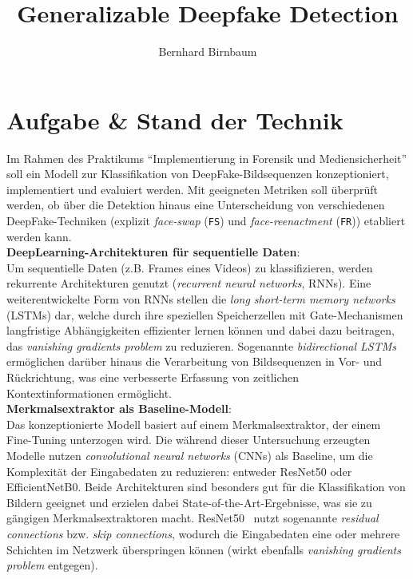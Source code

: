 \documentclass{article}
\title{Generalizable Deepfake Detection}
\author{Bernhard Birnbaum}
\newcommand{\resnet}{ResNet50\xspace}
\newcommand{\effnet}{EfficientNetB0\xspace}
\begin{document}
\maketitle

\section{Aufgabe \& Stand der Technik}\label{sec:introduction}
Im Rahmen des Praktikums \enquote{Implementierung in Forensik und Mediensicherheit} soll ein Modell zur Klassifikation von DeepFake-Bildsequenzen konzeptioniert, implementiert und evaluiert werden.
Mit geeigneten Metriken soll überprüft werden, ob über die Detektion hinaus eine Unterscheidung von verschiedenen DeepFake-Techniken (explizit \textit{face-swap} (\texttt{FS}) und \textit{face-reenactment} (\texttt{FR})) etabliert werden kann.
\\[0.5em]
\textbf{DeepLearning-Architekturen für sequentielle Daten}:\\
Um sequentielle Daten (z.B. Frames eines Videos) zu klassifizieren, werden rekurrente Architekturen genutzt (\textit{recurrent neural networks}, RNNs).
Eine weiterentwickelte Form von RNNs stellen die \textit{long short-term memory networks} (LSTMs) dar, welche durch ihre speziellen Speicherzellen mit Gate-Mechanismen langfristige Abhängigkeiten effizienter lernen können und dabei dazu beitragen, das \textit{vanishing gradients problem} zu reduzieren.
Sogenannte \textit{bidirectional LSTMs} ermöglichen darüber hinaus die Verarbeitung von Bildsequenzen in Vor- und Rückrichtung, was eine verbesserte Erfassung von zeitlichen Kontextinformationen ermöglicht.
\\[0.5em]
\textbf{Merkmalsextraktor als Baseline-Modell}:\\
Das konzeptionierte Modell basiert auf einem Merkmalsextraktor, der einem Fine-Tuning unterzogen wird.
Die während dieser Untersuchung erzeugten Modelle nutzen \textit{convolutional neural networks} (CNNs) als Baseline, um die Komplexität der Eingabedaten zu reduzieren: entweder \resnet oder \effnet.
Beide Architekturen sind besonders gut für die Klassifikation von Bildern geeignet und erzielen dabei State-of-the-Art-Ergebnisse, was sie zu gängigen Merkmalsextraktoren macht.
\resnet~\cite{resnet} nutzt sogenannte \textit{residual connections} bzw. \textit{skip connections}, wodurch die Eingabedaten eine oder mehrere Schichten im Netzwerk überspringen können (wirkt ebenfalls \textit{vanishing gradients problem} entgegen).
\end{document}
